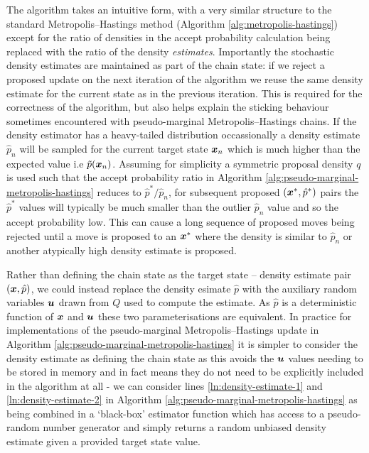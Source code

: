 The algorithm takes an intuitive form, with a very similar structure to the standard Metropolis--Hastings method (Algorithm \ref{alg:metropolis-hastings}) except for the ratio of densities in the accept probability calculation being replaced with the ratio of the density \emph{estimates}. Importantly the stochastic density estimates are maintained as part of the chain state: if we reject a proposed update on the next iteration of the algorithm we reuse the same density estimate for the current state as in the previous iteration. This is required for the correctness of the algorithm, but also helps explain the sticking behaviour sometimes encountered with pseudo-marginal Metropolis--Hastings chains. If the density estimator has a heavy-tailed distribution occassionally a density estimate $\hat{p}_n$ will be sampled for the current target state $\boldsymbol{x}_n$ which is much higher than the expected value i.e $\tilde{p}(\boldsymbol{x}_n)$. Assuming for simplicity a symmetric proposal density $q$ is used such that the accept probability ratio in Algorithm \ref{alg:pseudo-marginal-metropolis-hastings} reduces to $\hat{p}^* / \hat{p}_n$, for subsequent proposed $(\boldsymbol{x}^*,\hat{p}^*)$ pairs the $\hat{p}^*$ values will typically be much smaller than the outlier $\hat{p}_n$ value and so the accept probability low. This can cause a long sequence of proposed moves being rejected until a move is proposed to an $\boldsymbol{x}^*$ where the density is similar to $\hat{p}_n$ or another atypically high density estimate is proposed.

Rather than defining the chain state as the target state -- density estimate pair $(\boldsymbol{x},\hat{p})$, we could instead replace the density esimate $\hat{p}$ with the auxiliary random variables $\boldsymbol{u}$ drawn from $Q$ used to compute the estimate. As $\hat{p}$ is a deterministic function of $\boldsymbol{x}$ and $\boldsymbol{u}$ these two parameterisations are equivalent. In practice for implementations of the pseudo-marginal Metropolis--Hastings update in Algorithm \ref{alg:pseudo-marginal-metropolis-hastings} it is simpler to consider the density estimate as defining the chain state as this avoids the $\boldsymbol{u}$ values needing to be stored in memory and in fact means they do not need to be explicitly included in the algorithm at all - we can consider lines \ref{ln:density-estimate-1} and \ref{ln:density-estimate-2} in Algorithm \ref{alg:pseudo-marginal-metropolis-hastings} as being combined in a `black-box' estimator function which has access to a pseudo-random number generator and simply returns a random unbiased density estimate given a provided target state value.

